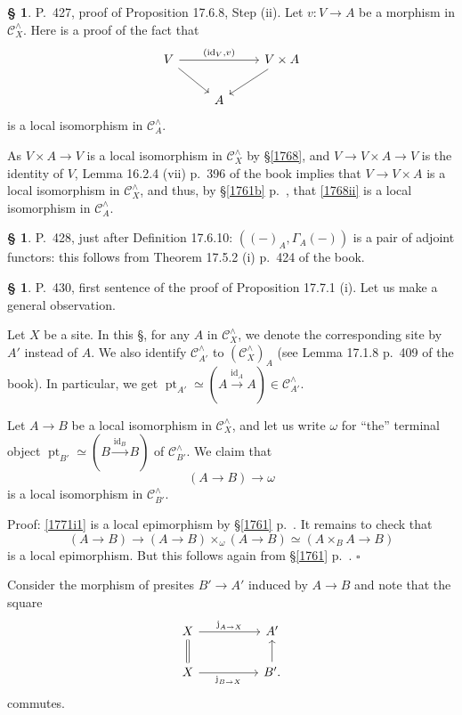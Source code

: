 \documentclass[12pt]{article}
\theoremstyle{remark}
\theoremstyle{definition}
\newtheorem{s}[thm]{\S}
\newcommand{\oo}{\operatorname}
\newcommand{\C}{\mathcal C}
\newcommand{\xr}{\xrightarrow}
\DeclareMathOperator{\id}{id}
\begin{document}
%

\begin{s}
P.~427, proof of Proposition 17.6.8, Step (ii). Let $v:V\to A$ be a morphism in $\C_X^\wedge$. Here is a proof of the fact that 
\begin{equation}\label{1768ii}
\begin{tikzcd} 
V\ar{rr}{(\id_V,v)}\ar{dr}&&V\times A\ar{dl}\\ 
{}&A
\end{tikzcd}
\end{equation} 
is a local isomorphism in $\C_A^\wedge$. 

As $V\times A\to V$ is a local isomorphism in $\C_X^\wedge$ by \S\ref{1768}, and $V\to V\times A\to V$ is the identity of $V$, Lemma 16.2.4 (vii) p.~396 of the book implies that $V\to V\times A$ is a local isomorphism in $\C_X^\wedge$, and thus, by \S\ref{1761b} p.~\pageref{1761b}, that \eqref{1768ii} is a local isomorphism in $\C_A^\wedge$. 
\end{s} 

%

\begin{s}\label{a428}
P.~428, just after Definition 17.6.10: $((-)_A,\Gamma_A(-))$ is a pair of adjoint functors: this follows from Theorem 17.5.2 (i) p.~424 of the book.
\end{s} 

%

\begin{s} 
P.~430, first sentence of the proof of Proposition 17.7.1 (i). Let us make a general observation. 

Let $X$ be a site. In this \S, for any $A$ in $\C_X^\wedge$, we denote the corresponding site by $A'$ instead of $A$. We also identify $\C_{A'}^\wedge$ to $(\C_X^\wedge)_A$ (see Lemma 17.1.8 p.~409 of the book). In particular, we get $\oo{pt}_{A'}\simeq(A\xr{\id_A}A)\in\C_{A'}^\wedge$. 

Let $A\to B$ be a local isomorphism in $\C_X^\wedge$, and let us write $\omega$ for ``the'' terminal object $\oo{pt}_{B'}\simeq(B\xr{\id_B}B)$ of $\C_{B'}^\wedge$. We claim that 
\begin{equation}\label{1771i1}
(A\to B)\to\omega 
\end{equation} 
is a local isomorphism in $\C_{B'}^\wedge$.

Proof: \eqref{1771i1} is a local epimorphism by \S\ref{1761} p.~\pageref{1761}. It remains to check that 
\begin{equation}\label{1771i2}
(A\to B)\to(A\to B)\times_\omega(A\to B)\simeq(A\times_BA\to B)
\end{equation} 
is a local epimorphism. But this follows again from \S\ref{1761} p.~\pageref{1761}. $\square$ 

Consider the morphism of presites $B'\to A'$ induced by $A\to B$ and note that the square
$$
\begin{tikzcd} 
X\ar{rr}{\oo j_{A\to X}}\ar[equal]{d}&&A'\\ 
X\ar{rr}[swap]{\oo j_{B\to X}}&&B'.\ar{u}
\end{tikzcd}
$$ 
commutes.
\end{s} 
\end{document}
